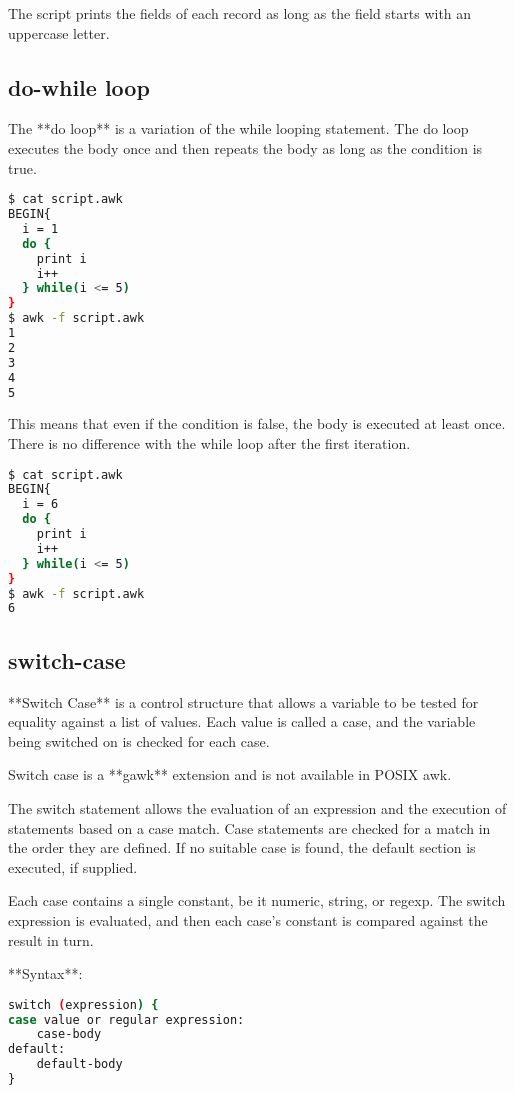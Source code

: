 The script prints the fields of each record as long as the field starts with an uppercase letter.

\subsection{do-while loop}
The **do loop** is a variation of the while looping statement.
The do loop executes the body once and then repeats the body as long as the condition is true. 

\begin{lstlisting}[language=bash]
$ cat script.awk
BEGIN{
  i = 1
  do {
    print i
    i++
  } while(i <= 5)
}
$ awk -f script.awk
1
2
3
4
5
\end{lstlisting}

This means that even if the condition is false, the body is executed at least once.
There is no difference with the while loop after the first iteration.

\begin{lstlisting}[language=bash]
$ cat script.awk
BEGIN{
  i = 6
  do {
    print i
    i++
  } while(i <= 5)
}
$ awk -f script.awk
6
\end{lstlisting}

\subsection{switch-case}

**Switch Case** is a control structure that allows a variable to be tested for equality against a list of values.
Each value is called a case, and the variable being switched on is checked for each case.

\begin{remark}
  Switch case is a **gawk** extension and is not available in POSIX awk.
\end{remark}

The switch statement allows the evaluation of an expression and the execution of statements based on a case match.
Case statements are checked for a match in the order they are defined.
If no suitable case is found, the default section is executed, if supplied.

Each case contains a single constant, be it numeric, string, or regexp.
The switch expression is evaluated, and then each case's constant is compared against the result in turn.

**Syntax**:
\begin{lstlisting}[language=bash]
switch (expression) {
case value or regular expression:
    case-body
default:
    default-body
}
\end{lstlisting}

